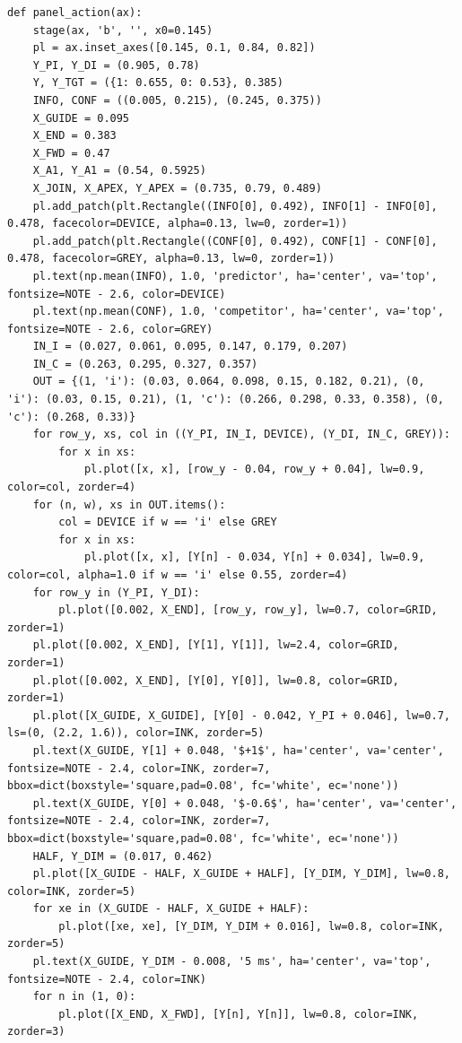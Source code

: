 \documentclass[a4paper,10pt]{article}
\begin{document}
\begin{Verbatim}
def panel_action(ax):
    stage(ax, 'b', '', x0=0.145)
    pl = ax.inset_axes([0.145, 0.1, 0.84, 0.82])
    Y_PI, Y_DI = (0.905, 0.78)
    Y, Y_TGT = ({1: 0.655, 0: 0.53}, 0.385)
    INFO, CONF = ((0.005, 0.215), (0.245, 0.375))
    X_GUIDE = 0.095
    X_END = 0.383
    X_FWD = 0.47
    X_A1, Y_A1 = (0.54, 0.5925)
    X_JOIN, X_APEX, Y_APEX = (0.735, 0.79, 0.489)
    pl.add_patch(plt.Rectangle((INFO[0], 0.492), INFO[1] - INFO[0], 0.478, facecolor=DEVICE, alpha=0.13, lw=0, zorder=1))
    pl.add_patch(plt.Rectangle((CONF[0], 0.492), CONF[1] - CONF[0], 0.478, facecolor=GREY, alpha=0.13, lw=0, zorder=1))
    pl.text(np.mean(INFO), 1.0, 'predictor', ha='center', va='top', fontsize=NOTE - 2.6, color=DEVICE)
    pl.text(np.mean(CONF), 1.0, 'competitor', ha='center', va='top', fontsize=NOTE - 2.6, color=GREY)
    IN_I = (0.027, 0.061, 0.095, 0.147, 0.179, 0.207)
    IN_C = (0.263, 0.295, 0.327, 0.357)
    OUT = {(1, 'i'): (0.03, 0.064, 0.098, 0.15, 0.182, 0.21), (0, 'i'): (0.03, 0.15, 0.21), (1, 'c'): (0.266, 0.298, 0.33, 0.358), (0, 'c'): (0.268, 0.33)}
    for row_y, xs, col in ((Y_PI, IN_I, DEVICE), (Y_DI, IN_C, GREY)):
        for x in xs:
            pl.plot([x, x], [row_y - 0.04, row_y + 0.04], lw=0.9, color=col, zorder=4)
    for (n, w), xs in OUT.items():
        col = DEVICE if w == 'i' else GREY
        for x in xs:
            pl.plot([x, x], [Y[n] - 0.034, Y[n] + 0.034], lw=0.9, color=col, alpha=1.0 if w == 'i' else 0.55, zorder=4)
    for row_y in (Y_PI, Y_DI):
        pl.plot([0.002, X_END], [row_y, row_y], lw=0.7, color=GRID, zorder=1)
    pl.plot([0.002, X_END], [Y[1], Y[1]], lw=2.4, color=GRID, zorder=1)
    pl.plot([0.002, X_END], [Y[0], Y[0]], lw=0.8, color=GRID, zorder=1)
    pl.plot([X_GUIDE, X_GUIDE], [Y[0] - 0.042, Y_PI + 0.046], lw=0.7, ls=(0, (2.2, 1.6)), color=INK, zorder=5)
    pl.text(X_GUIDE, Y[1] + 0.048, '$+1$', ha='center', va='center', fontsize=NOTE - 2.4, color=INK, zorder=7, bbox=dict(boxstyle='square,pad=0.08', fc='white', ec='none'))
    pl.text(X_GUIDE, Y[0] + 0.048, '$-0.6$', ha='center', va='center', fontsize=NOTE - 2.4, color=INK, zorder=7, bbox=dict(boxstyle='square,pad=0.08', fc='white', ec='none'))
    HALF, Y_DIM = (0.017, 0.462)
    pl.plot([X_GUIDE - HALF, X_GUIDE + HALF], [Y_DIM, Y_DIM], lw=0.8, color=INK, zorder=5)
    for xe in (X_GUIDE - HALF, X_GUIDE + HALF):
        pl.plot([xe, xe], [Y_DIM, Y_DIM + 0.016], lw=0.8, color=INK, zorder=5)
    pl.text(X_GUIDE, Y_DIM - 0.008, '5 ms', ha='center', va='top', fontsize=NOTE - 2.4, color=INK)
    for n in (1, 0):
        pl.plot([X_END, X_FWD], [Y[n], Y[n]], lw=0.8, color=INK, zorder=3)

\end{Verbatim}
\end{document}
